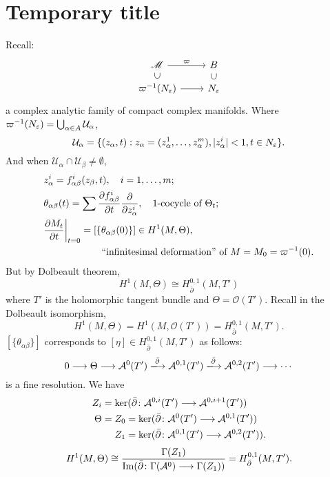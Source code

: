 \documentclass[12pt]{article}
\begin{document}
\section{Temporary title}
Recall:
\[\begin{tikzcd}[row sep=small]
	{\mathscr{M}} & B \\
	{\varpi^{-1}(N_\eps)} & {N_\eps}
	\arrow["{\varpi}", from=1-1, to=1-2]
	\arrow["\subset"{marking, allow upside down}, draw=none, from=2-1, to=1-1]
	\arrow[from=2-1, to=2-2]
	\arrow["\subset"{marking, allow upside down}, draw=none, from=2-2, to=1-2]
\end{tikzcd}\]
a complex analytic family of compact complex manifolds. Where
\(\varpi^{-1}(N_\varepsilon)=\bigcup_{\alpha\in A}\mathcal{U}_\alpha\), \[
  \mathcal{U}_\alpha=\{(z_\alpha,t):z_\alpha=(z^1_\alpha,\ldots,z^m_\alpha),
  |z_\alpha^i|<1,t\in N_\varepsilon\}
.\] And when \(\mathcal{U}_\alpha\cap \mathcal{U}_\beta\neq \emptyset\),
\begin{align*}
  &z_\alpha^i=f_{\alpha\beta}^i(z_\beta,t),\quad i=1,\ldots,m; \\
  &\theta_{\alpha\beta}(t)=\sum \pdv{f_{\alpha\beta}^i}{t}\pdv{}{z^i_\alpha},\quad
  \text{1-cocycle of }\Theta_t; \\
  &\pdv{M_t}{t}\bigg|_{t=0}=[\{\theta_{\alpha\beta}(0)\}]\in H^1(M,\Theta), \\
  &\qquad\qquad\qquad\text{``infinitesimal deformation'' of }M=M_0=\varpi^{-1}(0)
.\end{align*}
But by Dolbeault theorem, \[
  H^1(M,\Theta)\cong H^{0,1}_{\bar{\partial}}(M,T')
\] where \(T'\) is the holomorphic tangent bundle and \(\Theta=\mathcal{O}(T')\).
Recall in the Dolbeault isomorphism, \[
  H^1(M,\Theta)=H^1(M,\mathcal{O}(T'))=H^{0,1}_{\bar{\partial}}(M,T')
.\] \([\{\theta_{\alpha\beta}\}]\) corresponds to \([\eta]\in H^{0,1}_{\bar{\partial}}
(M,T')\) as follows: \[
  0\lrr \Theta\lrr \mathcal{A}^0(T')\xrr{\bar{\partial}}\mathcal{A}^{0,1}(T')
  \xrr{\bar{\partial}}\mathcal{A}^{0,2}(T')\lrr \cdots
\] is a fine resolution. We have
\begin{align*}
  Z_i&=\ker(\bar{\partial}\colon \mathcal{A}^{0,i}(T')\longrightarrow \mathcal{A}^{0,i+1}(T')) \\
  \Theta&=Z_0=\ker(\bar{\partial}\colon\mathcal{A}^{0}(T')
    \longrightarrow\mathcal{A}^{0,1}(T'))\\
  &\mathrel{\phantom{=}}Z_1=\ker(\bar{\partial}\colon\mathcal{A}^{0,1}(T')
    \longrightarrow\mathcal{A}^{0,2}(T'))
.\end{align*}
\[
  H^1(M,\Theta)\cong \frac{\Gamma(Z_1)}{\operatorname{Im}(\bar{\partial}\colon \Gamma(\mathcal{A}^0)
    \longrightarrow \Gamma(Z_1))}=H^{0,1}_{\bar{\partial}}(M,T')
.\] 
\end{document}
